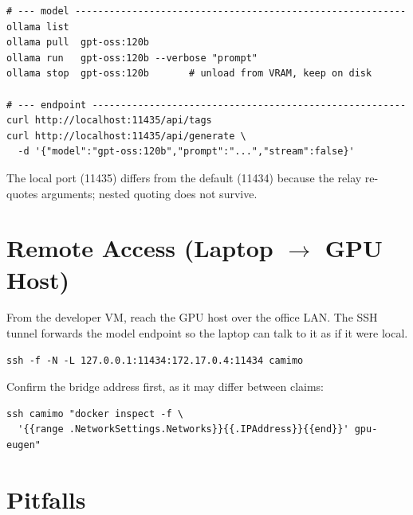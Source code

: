 \documentclass[11pt,a4paper]{article}
\begin{document}
\begin{lstlisting}
# --- model ----------------------------------------------------------
ollama list
ollama pull  gpt-oss:120b
ollama run   gpt-oss:120b --verbose "prompt"
ollama stop  gpt-oss:120b       # unload from VRAM, keep on disk

# --- endpoint -------------------------------------------------------
curl http://localhost:11435/api/tags
curl http://localhost:11435/api/generate \
  -d '{"model":"gpt-oss:120b","prompt":"...","stream":false}'
\end{lstlisting}

The local port (11435) differs from the default (11434) because the relay re-quotes
arguments; nested quoting does not survive.

\section{Remote Access (Laptop $\rightarrow$ GPU Host)}

From the developer VM, reach the GPU host over the office LAN. The SSH tunnel
forwards the model endpoint so the laptop can talk to it as if it were local.

\begin{lstlisting}
ssh -f -N -L 127.0.0.1:11434:172.17.0.4:11434 camimo
\end{lstlisting}

Confirm the bridge address first, as it may differ between claims:

\begin{lstlisting}
ssh camimo "docker inspect -f \
  '{{range .NetworkSettings.Networks}}{{.IPAddress}}{{end}}' gpu-eugen"
\end{lstlisting}

\section{Pitfalls}
\end{document}
